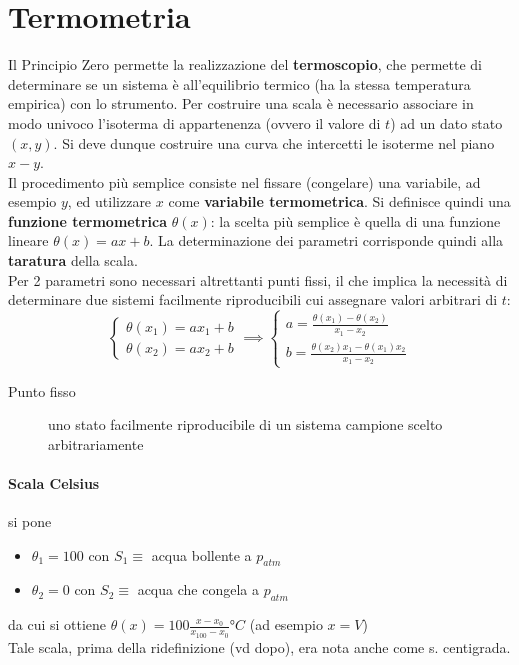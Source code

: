 \documentclass[10pt, oneside]{book}
\begin{document}
\section{Termometria}
Il Principio Zero permette la realizzazione del \textbf{termoscopio}, che permette di determinare se un sistema è all'equilibrio termico (ha la stessa temperatura empirica) con lo strumento. Per costruire una scala è necessario associare in modo univoco l'isoterma di appartenenza (ovvero il valore di $t$) ad un dato stato $(x,y)$. Si deve dunque costruire una curva che intercetti le isoterme nel piano $x-y$. 
\\Il procedimento più semplice consiste nel fissare (congelare) una variabile, ad esempio $y$, ed utilizzare $x$ come \textbf{variabile termometrica}. Si definisce quindi una \textbf{funzione termometrica} $\theta(x)$: la scelta più semplice è quella di una funzione lineare $\theta(x) = ax + b$. La determinazione dei parametri corrisponde quindi alla \textbf{taratura} della scala.
\\Per 2 parametri sono necessari altrettanti punti fissi, il che implica la necessità di determinare due sistemi facilmente riproducibili cui assegnare valori arbitrari di $t$:
\[\begin{cases} \theta (x_1) = a x_1 + b \\ \theta (x_2) = a x_2 + b

\end{cases} \implies \begin{cases} a = \frac{\theta (x_1) - \theta (x_2)}{x_1 - x_2} \\ b = \frac{\theta (x_2) x_1 - \theta (x_1) x_2}{x_1 - x_2}

\end{cases}\]
\begin{description}
\item[Punto fisso] uno stato facilmente riproducibile di un sistema campione scelto arbitrariamente
\end{description}

\paragraph{Scala Celsius} si pone
\begin{itemize}
\item $\theta_1 = 100$ con $S_1 \equiv$ acqua bollente a $p_{atm}$
\item $\theta_2 = 0$ con $S_2 \equiv$ acqua che congela a $p_{atm}$
\end{itemize}
da cui si ottiene $\displaystyle \theta(x) = 100 \frac{x - x_0}{x_100 - x_0} °C$ (ad esempio $x = V$)
\\Tale scala, prima della ridefinizione (vd dopo), era nota anche come s. centigrada.
\end{document}
